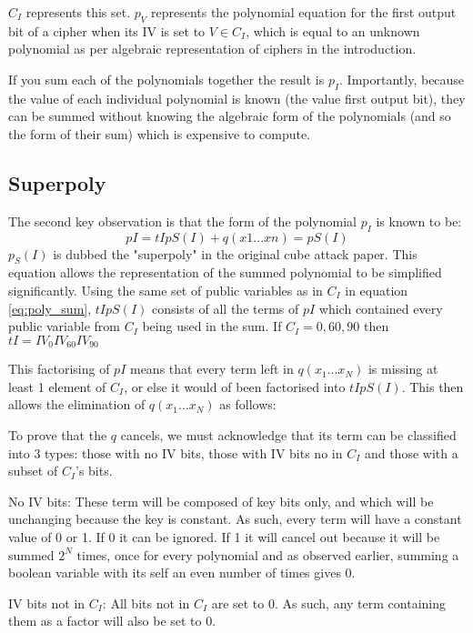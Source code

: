 \documentclass{report}
\begin{document}
$C_I$ represents this set. $p_V$ represents the polynomial equation for the first output bit of a cipher when its IV is set to $V \in C_I$, which is equal to an unknown polynomial as per algebraic representation of ciphers in the introduction.

If you sum each of the polynomials together the result is $p_I$. Importantly, because the value of each individual polynomial is known (the value first output bit), they can be summed without knowing the algebraic form of the polynomials (and so the form of their sum) which is expensive to compute.

\subsection{Superpoly}
The second key observation is that the form of the polynomial $p_I$ is known to be:
\begin{equation} \label{eq:GFpowers}
pI = tIpS(I)+q(x1...xn)=pS(I)
\end{equation}
$p_S(I)$ is dubbed the "superpoly" in the original cube attack paper. This equation allows the representation of the summed polynomial to be simplified significantly. Using the same set of public variables as in $C_I$ in equation 
\ref{eq:poly_sum}, $tIpS(I)$ consists of all the terms of $pI$ which contained  every public variable from $C_I$ being used in the sum. If $C_I={0, 60, 90}$ then  $tI = IV_{0}IV_{60}IV_{90}$

This factorising of $pI$ means that every term left in $q(x_1...x_N)$ is missing at least 1 element of $C_I$, or else it would of been factorised into $tIpS(I)$. This then allows the elimination of $q(x_1...x_N)$ as follows:

To prove that the $q$ cancels, we must acknowledge that its term can be classified into 3 types: those with no IV bits, those with IV bits no in $C_I$ and those with a subset of $C_I$'s bits.

No IV bits:
These term will be composed of key bits only, and which will be unchanging because the key is constant. As such, every term will have a constant value of 0 or 1. If 0 it can be ignored. If 1 it will cancel out because it will be summed $2^N$ times, once for every polynomial and as observed earlier, summing a boolean variable with its self an even number of times gives 0.

IV bits not in $C_I$:
All bits not in $C_I$ are set to 0. As such, any term containing them as a factor will also be set to 0.
\end{document}
